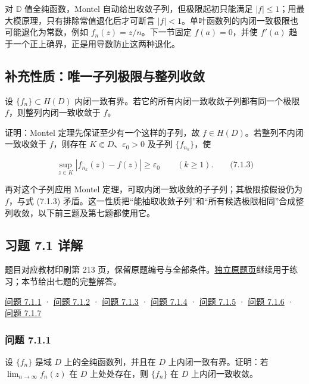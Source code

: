 \documentclass[11pt,a4paper]{article}
\begin{document}
对 \(\mathbb D\) 值全纯函数，Montel 自动给出收敛子列，但极限起初只能满足
\(|f|\le1\)；用最大模原理，只有排除常值退化后才可断言
\(|f|<1\)。单叶函数列的内闭一致极限也可能退化为常数，例如
\(f_n(z)=z/n\)。下一节固定 \(f(a)=0\)，并使 \(f'(a)\)
趋于一个正上确界，正是用导数防止这两种退化。

\subsection*{补充性质：唯一子列极限与整列收敛}\label{ch07-s1-heading-8}

设 \(\{f_n\}\subset H(D)\)
内闭一致有界。若它的所有内闭一致收敛子列都有同一个极限
\(f\)，则整列内闭一致收敛于 \(f\)。

证明：Montel 定理先保证至少有一个这样的子列，故
\(f\in H(D)\)。若整列不内闭一致收敛于 \(f\)，则存在
\(K\Subset D\)、\(\varepsilon_0>0\) 及子列 \(\{f_{n_k}\}\)，使

\[
\sup_{z\in K}|f_{n_k}(z)-f(z)|\ge\varepsilon_0\qquad(k\ge1).
\qquad\text{(7.1.3)}
\]

再对这个子列应用 Montel 定理，可取内闭一致收敛的子子列；其极限按假设仍为
\(f\)，与式 (7.1.3)
矛盾。这一性质把``能抽取收敛子列''和``所有候选极限相同''合成整列收敛，以下前三题及第七题都使用它。

\subsection*{习题 7.1 详解}\label{ch07-s1-heading-9}

题目对应教材印刷第 213
页，保留原题编号与全部条件。\hyperref[ch07-practice-heading-2]{独立原题页}继续用于练习；本节给出七题的完整解答。

\hyperref[ch07-s1-ux95eeux9898-711]{问题 7.1.1} ·
\hyperref[ch07-s1-ux95eeux9898-712]{问题 7.1.2} ·
\hyperref[ch07-s1-ux95eeux9898-713]{问题 7.1.3} ·
\hyperref[ch07-s1-ux95eeux9898-714]{问题 7.1.4} ·
\hyperref[ch07-s1-ux95eeux9898-715]{问题 7.1.5} ·
\hyperref[ch07-s1-ux95eeux9898-716]{问题 7.1.6} ·
\hyperref[ch07-s1-ux95eeux9898-717]{问题 7.1.7}

\subsubsection{问题 7.1.1}\label{ch07-s1-ux95eeux9898-711}

设 \(\{f_n\}\) 是域 \(D\) 上的全纯函数列，并且在 \(D\)
上内闭一致有界。证明：若 \(\lim_{n\to\infty}f_n(z)\) 在 \(D\)
上处处存在，则 \(\{f_n\}\) 在 \(D\) 上内闭一致收敛。
\end{document}
